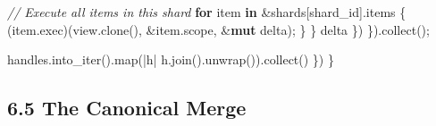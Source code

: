 \documentclass[
]{book}
\newenvironment{Shaded}{}{}
\newcommand{\CommentTok}[1]{\textcolor[rgb]{0.38,0.63,0.69}{\textit{#1}}}
\newcommand{\ControlFlowTok}[1]{\textcolor[rgb]{0.00,0.44,0.13}{\textbf{#1}}}
\newcommand{\KeywordTok}[1]{\textcolor[rgb]{0.00,0.44,0.13}{\textbf{#1}}}
\newcommand{\NormalTok}[1]{#1}
\newcommand{\OperatorTok}[1]{\textcolor[rgb]{0.40,0.40,0.40}{#1}}
\begin{document}
\begin{Shaded}
\begin{Highlighting}[]
                    \CommentTok{// Execute all items in this shard}
                    \ControlFlowTok{for}\NormalTok{ item }\KeywordTok{in} \OperatorTok{\&}\NormalTok{shards[shard\_id]}\OperatorTok{.}\NormalTok{items }\OperatorTok{\{}
\NormalTok{                        (item}\OperatorTok{.}\NormalTok{exec)(view}\OperatorTok{.}\NormalTok{clone()}\OperatorTok{,} \OperatorTok{\&}\NormalTok{item}\OperatorTok{.}\NormalTok{scope}\OperatorTok{,} \OperatorTok{\&}\KeywordTok{mut}\NormalTok{ delta)}\OperatorTok{;}
                    \OperatorTok{\}}
                \OperatorTok{\}}
\NormalTok{                delta}
            \OperatorTok{\}}\NormalTok{)}
        \OperatorTok{\}}\NormalTok{)}\OperatorTok{.}\NormalTok{collect()}\OperatorTok{;}

\NormalTok{        handles}\OperatorTok{.}\NormalTok{into\_iter()}\OperatorTok{.}\NormalTok{map(}\OperatorTok{|}\NormalTok{h}\OperatorTok{|}\NormalTok{ h}\OperatorTok{.}\NormalTok{join()}\OperatorTok{.}\NormalTok{unwrap())}\OperatorTok{.}\NormalTok{collect()}
    \OperatorTok{\}}\NormalTok{)}
\OperatorTok{\}}
\end{Highlighting}
\end{Shaded}

\subsection{6.5 The Canonical Merge}\label{the-canonical-merge}
\end{document}
